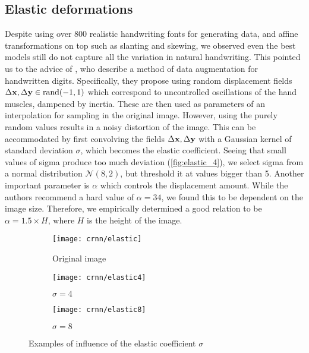 	\subsection{Elastic deformations}
			Despite using over 800 realistic handwriting fonts for generating data, and affine transformations on top such as slanting and skewing, we observed even the best models still do not capture all the variation in natural handwriting. This pointed us to the advice of \citet{elastic_distortions}, who describe a method of data augmentation for handwritten digits. Specifically, they propose using random displacement fields \(\Delta \mathbf{x}, \Delta \mathbf{y} \in \operatorname{rand}(-1,1)\) which correspond to uncontrolled oscillations of the hand muscles, dampened by inertia. These are then used as parameters of an interpolation for sampling in the original image. However, using the purely random values results in a noisy distortion of the image. This can be accommodated by first convolving the fields \(\Delta \mathbf{x}, \Delta \mathbf{y}\) with a Gaussian kernel of standard deviation \(\sigma\), which becomes the elastic coefficient. Seeing that small values of sigma produce too much deviation (\autoref{fig:elastic_4}), we select sigma from a normal distribution \(\mathcal{N}(8, 2)\), but threshold it at values bigger than 5. Another important parameter is \(\alpha\) which controls the displacement amount. While the authors recommend a hard value of \(\alpha=34\), we found this to be dependent on the image size. Therefore, we empirically determined a good relation to be \(\alpha = 1.5 \times H\), where \(H\) is the height of the image.
			\begin{figure}
				\begin{subfigure}[t]{.32\linewidth}
					\texttt{[image: crnn/elastic]}
					\caption{Original image}\label{fig:elastic_0}
				\end{subfigure}
				\begin{subfigure}[t]{.32\linewidth}
					\texttt{[image: crnn/elastic4]}
					\caption{\(\sigma = 4\)}\label{fig:elastic_4}
				\end{subfigure}
				\begin{subfigure}[t]{.32\linewidth}
					\texttt{[image: crnn/elastic8]}
					\caption{\(\sigma = 8\)}\label{fig:elastic_8}
				\end{subfigure}
				\caption[Elastic deformations]{Examples of influence of the elastic coefficient \(\sigma\)}
			\end{figure}


